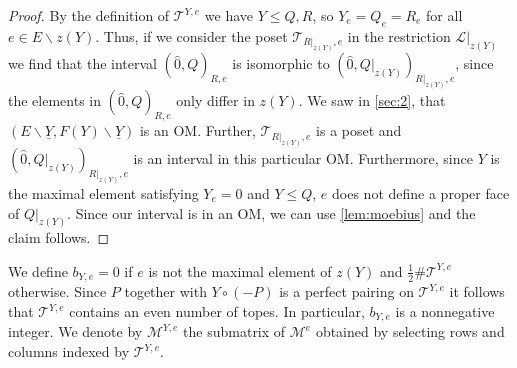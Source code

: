 \documentclass[12pt]{amsart}
\def\Tscr{{\mathcal T}}
\theoremstyle{plain}
\numberwithin{Lemma}{\DefaultNumberTheoremWithin}
\numberwithin{Claim}{\DefaultNumberTheoremWithin}
\numberwithin{Theorem}{\DefaultNumberTheoremWithin}
\numberwithin{Corollary}{\DefaultNumberTheoremWithin}
\numberwithin{Proposition}{\DefaultNumberTheoremWithin}
\numberwithin{Conjecture}{\DefaultNumberTheoremWithin}
\numberwithin{Situation}{\DefaultNumberTheoremWithin}
\numberwithin{Note}{\DefaultNumberTheoremWithin}
\theoremstyle{definition}
\numberwithin{Definition}{\DefaultNumberTheoremWithin}
\theoremstyle{definition}
\numberwithin{Question}{\DefaultNumberTheoremWithin}
\theoremstyle{definition}
\numberwithin{Problem}{\DefaultNumberTheoremWithin}
\theoremstyle{remark} \newtheorem{Remark}{Remark}
\numberwithin{Remark}{\DefaultNumberTheoremWithin}
\theoremstyle{remark}
\numberwithin{Example}{\DefaultNumberTheoremWithin}
\numberwithin{Case}{Lemma}
\numberwithin{Step}{Lemma}
\begin{document}
\begin{proof}
  By the definition of $\Tscr^{Y,e}$ we have $Y \le Q,R$, so $Y_e = Q_e = R_e$ for all $e \in E\backslash z(Y)$. Thus, if we consider the poset $\Tscr_{R|_{z(Y)},e}$ in the restriction $\mathcal{L}|_{z(Y)}$ we find that the interval $(\hat{0},Q)_{R,e}$ is isomorphic to $(\hat{0}, Q|_{z(Y)})_{ R|_{z(Y)},e}$, since the elements in $(\hat{0},Q)_{R,e}$ only differ in $z(Y)$. We saw in  \ref{sec:2}, that $(E\backslash \underline{Y}, F(Y)\backslash \underline{Y})$ is an OM. Further, $\Tscr_{R|_{z(Y)},e}$ is a poset and $(\hat{0}, Q|_{z(Y)})_{ R|_{z(Y)},e}$ is an interval in this particular OM. Furthermore, since $Y$
is the maximal element satisfying $Y_e=0$ and $Y \le Q$, $e$ does not define a proper face of $Q|_{z(Y)}$. Since our interval is in an OM, we can use \ref{lem:moebius} and the claim follows.
\end{proof}
We define $b_{Y,e} = 0$ if $e$ is not the maximal element of 
$z(Y)$ and $\frac{1}{2} \# \Tscr^{Y,e}$ otherwise. 
Since $P$ together with $Y \circ (-P)$ is a perfect pairing on 
$\Tscr^{Y,e}$ it follows that $\Tscr^{Y,e}$ contains an even number of
topes. In particular, $b_{Y,e}$ is a nonnegative integer. 
We denote by $\mathcal{M}^{Y,e}$ the submatrix of $\mathcal{M}^e$ obtained by selecting rows and columns indexed by $\Tscr^{Y,e}$.  
\end{document}
